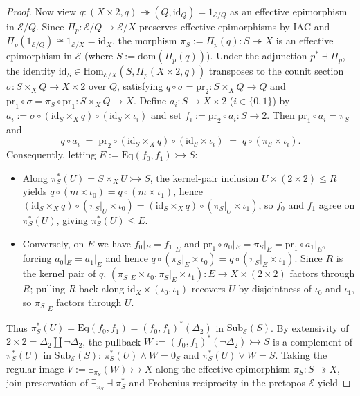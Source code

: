 \documentclass[10pt,twoside,openright]{book}
\theoremstyle{crmplain}
\theoremstyle{crmdef}
\theoremstyle{crmremark}
\begin{document}
\begin{proof}
Now view $q : (X \times 2, q) \twoheadrightarrow (Q, \mathrm{id}_Q) = 1_{\mathcal{E}/Q}$ as an effective epimorphism in $\mathcal{E}/Q$. Since $\Pi_p : \mathcal{E}/Q \to \mathcal{E}/X$ preserves effective epimorphisms by $\mathrm{IAC}$ and $\Pi_p(1_{\mathcal{E}/Q}) \cong 1_{\mathcal{E}/X} = \mathrm{id}_X$, the morphism $\pi_S := \Pi_p(q) : S \twoheadrightarrow X$ is an effective epimorphism in $\mathcal{E}$ (where $S := \mathrm{dom}(\Pi_p(q))$). Under the adjunction $p^* \dashv \Pi_p$, the identity $\mathrm{id}_S \in \mathrm{Hom}_{\mathcal{E}/X}(S, \Pi_p(X \times 2, q))$ transposes to the counit section $\sigma : S \times_X Q \to X \times 2$ over $Q$, satisfying $q \circ \sigma = \mathrm{pr}_2 : S \times_X Q \to Q$ and $\mathrm{pr}_1 \circ \sigma = \pi_S \circ \mathrm{pr}_1 : S \times_X Q \to X$. Define $a_i : S \to X \times 2$ ($i \in \{0,1\}$) by $a_i := \sigma \circ (\mathrm{id}_S \times_X q) \circ (\mathrm{id}_S \times \iota_i)$ and set $f_i := \mathrm{pr}_2 \circ a_i : S \to 2$. Then $\mathrm{pr}_1 \circ a_i = \pi_S$ and
\[
  q \circ a_i \;=\; \mathrm{pr}_2 \circ (\mathrm{id}_S \times_X q) \circ (\mathrm{id}_S \times \iota_i) \;=\; q \circ (\pi_S \times \iota_i).
\]
Consequently, letting $E := \mathrm{Eq}(f_0, f_1) \rightarrowtail S$:
\begin{itemize}[leftmargin=1.5em]
  \item Along $\pi_S^*(U) = S \times_X U \rightarrowtail S$, the kernel-pair inclusion $U \times (2 \times 2) \le R$ yields $q \circ (m \times \iota_0) = q \circ (m \times \iota_1)$, hence $(\mathrm{id}_S \times_X q) \circ (\pi_S|_U \times \iota_0) = (\mathrm{id}_S \times_X q) \circ (\pi_S|_U \times \iota_1)$, so $f_0$ and $f_1$ agree on $\pi_S^*(U)$, giving $\pi_S^*(U) \le E$.
  \item Conversely, on $E$ we have $f_0|_E = f_1|_E$ and $\mathrm{pr}_1 \circ a_0|_E = \pi_S|_E = \mathrm{pr}_1 \circ a_1|_E$, forcing $a_0|_E = a_1|_E$ and hence $q \circ (\pi_S|_E \times \iota_0) = q \circ (\pi_S|_E \times \iota_1)$. Since $R$ is the kernel pair of $q$, $(\pi_S|_E \times \iota_0, \pi_S|_E \times \iota_1) : E \to X \times (2 \times 2)$ factors through $R$; pulling $R$ back along $\mathrm{id}_X \times (\iota_0, \iota_1)$ recovers $U$ by disjointness of $\iota_0$ and $\iota_1$, so $\pi_S|_E$ factors through $U$.
\end{itemize}
Thus $\pi_S^*(U) = \mathrm{Eq}(f_0, f_1) = (f_0, f_1)^*(\Delta_2)$ in $\mathrm{Sub}_{\mathcal{E}}(S)$. By extensivity of $2 \times 2 = \Delta_2 \amalg \neg\Delta_2$, the pullback $W := (f_0, f_1)^*(\neg\Delta_2) \rightarrowtail S$ is a complement of $\pi_S^*(U)$ in $\mathrm{Sub}_{\mathcal{E}}(S)$: $\pi_S^*(U) \wedge W = 0_S$ and $\pi_S^*(U) \vee W = S$. Taking the regular image $V := \exists_{\pi_S}(W) \rightarrowtail X$ along the effective epimorphism $\pi_S : S \twoheadrightarrow X$, join preservation of $\exists_{\pi_S} \dashv \pi_S^*$ and Frobenius reciprocity in the pretopos $\mathcal{E}$ yield

\end{proof}
\end{document}
